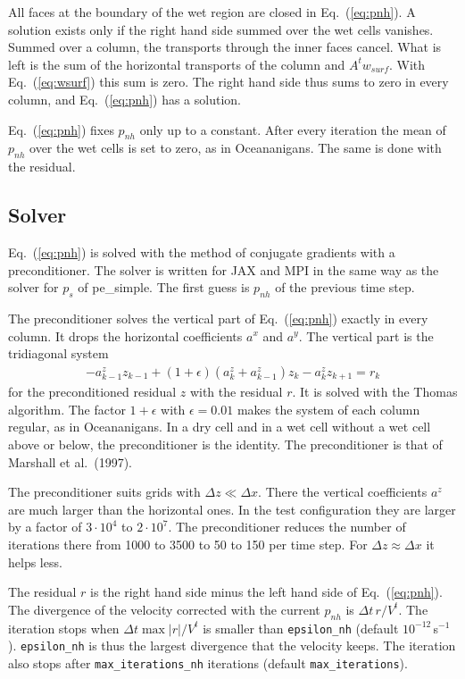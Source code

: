 \documentclass[12pt]{article}
\newcommand{\beq}  { \begin{eqnarray} }
\newcommand{\eeq}  { \end{eqnarray}}
\newcommand{\eq }  [1]{Eq.~(\ref{#1})}  %
\newcommand{\lk}{\left(}
\newcommand{\rk}{\right)}
\begin{document}
All faces at the boundary of the wet region are closed in \eq{eq:pnh}.
A solution exists only if the right hand side summed over the wet cells vanishes.
Summed over a column, the transports through the inner faces cancel.
What is left is the sum of the horizontal transports of the column and $A^t w_{surf}$.
With \eq{eq:wsurf} this sum is zero.
The right hand side thus sums to zero in every column, and \eq{eq:pnh} has a solution.

\eq{eq:pnh} fixes $p_{nh}$ only up to a constant.
After every iteration the mean of $p_{nh}$ over the wet cells is set to zero, as in Oceananigans.
The same is done with the residual.

\subsection*{Solver}

\eq{eq:pnh} is solved with the method of conjugate gradients with a preconditioner.
The solver is written for JAX and MPI in the same way as the solver for $p_s$ of pe\_simple.
The first guess is $p_{nh}$ of the previous time step.

The preconditioner solves the vertical part of \eq{eq:pnh} exactly in every column.
It drops the horizontal coefficients $a^x$ and $a^y$.
The vertical part is the tridiagonal system
\beq
 - a^z_{k-1} z_{k-1} + (1 + \epsilon) \lk a^z_k + a^z_{k-1} \rk z_k - a^z_k z_{k+1} = r_k
\eeq
for the preconditioned residual $z$ with the residual $r$.
It is solved with the Thomas algorithm.
The factor $1+\epsilon$ with $\epsilon = 0.01$ makes the system of each column regular, as in Oceananigans.
In a dry cell and in a wet cell without a wet cell above or below, the preconditioner is the identity.
The preconditioner is that of Marshall et al.\ (1997).

The preconditioner suits grids with $\Delta z \ll \Delta x$.
There the vertical coefficients $a^z$ are much larger than the horizontal ones.
In the test configuration they are larger by a factor of $3 \cdot 10^4$ to $2 \cdot 10^7$.
The preconditioner reduces the number of iterations there from 1000 to 3500 to 50 to 150 per time step.
For $\Delta z \approx \Delta x$ it helps less.

The residual $r$ is the right hand side minus the left hand side of \eq{eq:pnh}.
The divergence of the velocity corrected with the current $p_{nh}$ is $\Delta t\, r/V^t$.
The iteration stops when $\Delta t \max |r|/V^t$ is smaller than \verb|epsilon_nh| (default $10^{-12}\,$s$^{-1}$).
\verb|epsilon_nh| is thus the largest divergence that the velocity keeps.
The iteration also stops after \verb|max_iterations_nh| iterations (default \verb|max_iterations|).
\end{document}
